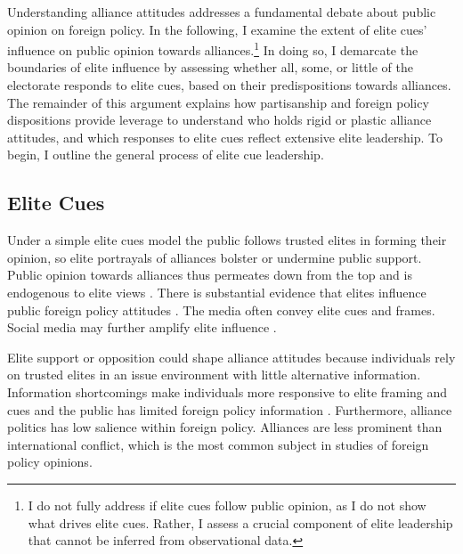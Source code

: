 \documentclass[12pt]{article}
\begin{document}


Understanding alliance attitudes addresses a fundamental debate about public opinion on foreign policy. 
In the following, I examine the extent of elite cues' influence on public opinion towards alliances.\footnote{I do not fully address if elite cues follow public opinion, as I do not show what drives elite cues. Rather, I assess a crucial component of elite leadership that cannot be inferred from observational data.}
In doing so, I demarcate the boundaries of elite influence by assessing whether all, some, or little of the electorate responds to elite cues, based on their predispositions towards alliances.
The remainder of this argument explains how partisanship and foreign policy dispositions provide leverage to understand who holds rigid or plastic alliance attitudes, and which responses to elite cues reflect extensive elite leadership. 
To begin, I outline the general process of elite cue leadership. 


\subsection{Elite Cues} 


Under a simple elite cues model the public follows trusted elites in forming their opinion, so elite portrayals of alliances bolster or undermine public support.
Public opinion towards alliances thus permeates down from the top and is endogenous to elite views \citep{Druckman2014}.
There is substantial evidence that elites influence public foreign policy attitudes \citep{BaumPotter2008}. 
The media often convey elite cues and frames.
Social media may further amplify elite influence \citep{BaumPotter2019}.   


Elite support or opposition could shape alliance attitudes because individuals rely on trusted elites in an issue environment with little alternative information. 
Information shortcomings make individuals more responsive to elite framing and cues \citep{Druckman2001, Peterson2017} and the public has limited foreign policy information \citep{BaumPotter2008}.
Furthermore, alliance politics has low salience within foreign policy. 
Alliances are less prominent than international conflict, which is the most common subject in studies of foreign policy opinions. 
\end{document}
